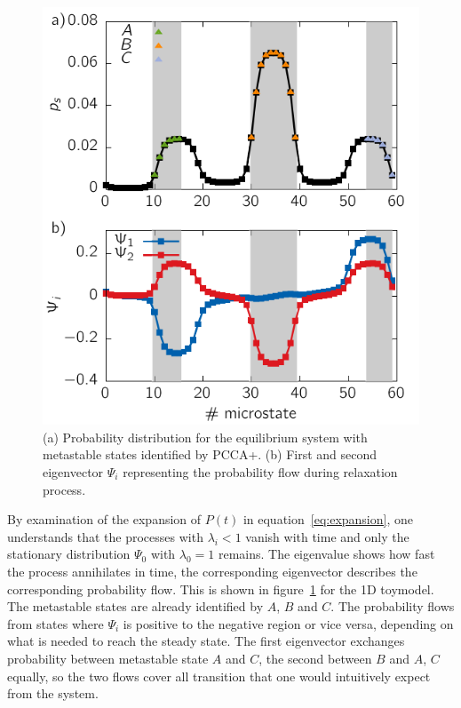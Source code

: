\begin{figure}[t]
\centering
 \includegraphics{../plots/MSM/Evec1.pdf}
 \caption{(a) Probability distribution for the equilibrium system with metastable states identified by PCCA+. (b) First and second eigenvector $\Psi_i$ representing the 
 probability flow during relaxation process. }
 \label{fig:Evec}
\end{figure}

By examination of the expansion of $P(t)$ in equation~\ref{eq:expansion}, one understands 
that the processes with $\lambda_i < 1$ vanish with time and only the stationary distribution $\Psi_0$ with $\lambda_0 = 1$ remains. The eigenvalue shows how fast the process annihilates in time, the corresponding eigenvector describes the corresponding probability flow. This is shown in figure~\ref{fig:Evec} for the 1D toymodel. The metastable states are already identified by $A$, $B$ and $C$. The probability flows from states where $\Psi_i$ is positive to the negative region or vice versa, depending on what is needed to reach the steady state. The first eigenvector exchanges probability between metastable state $A$ and $C$, the second between $B$ and $A$, $C$ equally, so the two flows 
cover all transition that one would intuitively expect from the system. 

